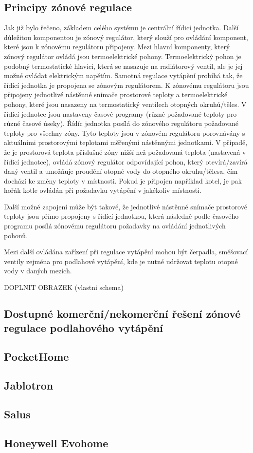 \subsection{Principy zónové regulace}
Jak již bylo řečeno, základem celého systému je centrální řídicí jednotka. Další důležitou komponentou je zónový regulátor, který slouží pro ovládání komponent, které jsou k zónovému regulátoru připojeny. Mezi hlavní komponenty, který zónový regulátor ovládá jsou termoelektrické pohony. Termoelektrický pohon je podobný termostatické hlavici, která se nasazuje na radiátorový ventil, ale je jej možné ovládat elektrickým napětím. Samotná regulace vytápění probíhá tak, že řídící jednotka je propojena se zónovým regulátorem. K zónovému regulátoru jsou připojeny jednotlivé nástěnné snímače  prostorové teploty a termoelektrické pohony, které jsou nasazeny na termostatický ventilech otopných okruhů/těles. V řídící jednotce jsou nastaveny časové programy (různé požadované teploty pro různé časové úseky). Řídíc jednotka posílá do zónového regulátoru požadované teploty pro všechny zóny. Tyto  teploty jsou v zónovém regulátoru porovnávány s aktuálními prostorovými teplotami měřenými nástěnnými jednotkami. V případě, že je prostorová teplota příslušné zóny nižší než požadovaná teplota (nastavená v řídicí jednotce), ovládá zónový regulátor odpovídající pohon, který otevírá/zavírá daný ventil a umožňuje proudění otopné vody do otopného okruhu/tělesa, čím dochází ke změny teploty v místnosti. Pokud je připojen například kotel, je pak hořák kotle ovládán při požadavku vytápění v jakékoliv místnosti. 

Další možné zapojení může být takové, že jednotlivé nástěnné snímače prostorové teploty jsou přímo propojeny s řídící jednotkou, která následně podle časového programu posílá zónovému regulátoru požadavky na ovládání jednotlivých pohonů. 

Mezi další ovládána zařízení při regulace vytápění mohou být čerpadla, směšovací ventily zejména pro podlahové vytápění, kde je nutné udržovat teplotu otopné vody v daných mezích.

DOPLNIT OBRAZEK (vlastni schema)



\subsection{Dostupné komerční/nekomerční řešení zónové regulace podlahového vytápění}
\subsection{PocketHome}
\subsection{Jablotron}
\subsection{Salus}
\subsection{Honeywell Evohome}








